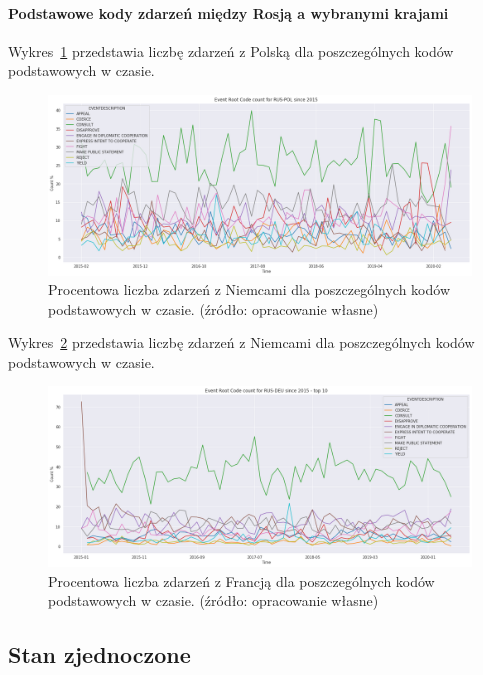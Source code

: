 \documentclass[11pt]{report}
\begin{document}
    \paragraph{Podstawowe kody zdarzeń między Rosją a wybranymi krajami}

    Wykres~\ref{fig:RUSPOLERC} przedstawia liczbę zdarzeń z Polską dla poszczególnych kodów podstawowych w czasie.
    \begin{figure}[!htp]
        \centering
        \includegraphics[width=1 \textwidth]{fig/RUS/RUSPOLERCperc.png}
        \caption{Procentowa liczba zdarzeń z Niemcami dla poszczególnych kodów podstawowych w czasie. (źródło: opracowanie własne)}
        \label{fig:RUSPOLERC}
    \end{figure}

    Wykres~\ref{fig:RUSRUSERC} przedstawia liczbę zdarzeń z Niemcami dla poszczególnych kodów podstawowych w czasie.
    \begin{figure}[!htp]
        \centering
        \includegraphics[width=1 \textwidth]{fig/RUS/RUSDEUERCperc.png}
        \caption{Procentowa liczba zdarzeń z Francją dla poszczególnych kodów podstawowych w czasie. (źródło: opracowanie własne)}
        \label{fig:RUSRUSERC}
    \end{figure}

    \subsection{Stan zjednoczone}
\end{document}
